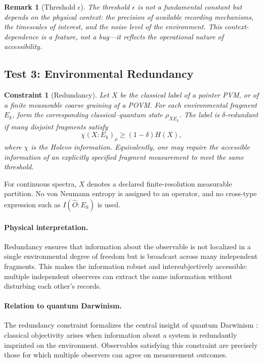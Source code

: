 \documentclass[12pt,a4paper,openany]{book}
\newtheorem{remark}[theorem]{Remark}
\newtheorem{constraint}[theorem]{Constraint}
\begin{document}
\begin{remark}[Threshold $\epsilon$]
The threshold $\epsilon$ is not a fundamental constant but depends on the physical context: the precision of available recording mechanisms, the timescales of interest, and the noise level of the environment. This context-dependence is a feature, not a bug---it reflects the operational nature of accessibility.
\end{remark}

\subsection{Test 3: Environmental Redundancy}

\begin{constraint}[Redundancy]
\label{E-const:redundancy}
Let $X$ be the classical label of a pointer PVM, or of a finite measurable coarse graining of a POVM.  For each environmental fragment $E_k$, form the corresponding classical--quantum state $\rho_{XE_k}$.  The label is $\delta$-redundant if many disjoint fragments satisfy
\begin{equation}
\chi(X:E_k)_{\rho}\ge(1-\delta)H(X),
\end{equation}
where $\chi$ is the Holevo information.  Equivalently, one may require the accessible information of an explicitly specified fragment measurement to meet the same threshold.
\end{constraint}

For continuous spectra, $X$ denotes a declared finite-resolution measurable partition.  No von Neumann entropy is assigned to an operator, and no cross-type expression such as $I(\hat O:E_k)$ is used.

\paragraph{Physical interpretation.}
Redundancy ensures that information about the observable is not localized in a single environmental degree of freedom but is broadcast across many independent fragments. This makes the information robust and intersubjectively accessible: multiple independent observers can extract the same information without disturbing each other's records.

\paragraph{Relation to quantum Darwinism.}
The redundancy constraint formalizes the central insight of quantum Darwinism \cite{Zurek2009}: classical objectivity arises when information about a system is redundantly imprinted on the environment. Observables satisfying this constraint are precisely those for which multiple observers can agree on measurement outcomes.
\end{document}
